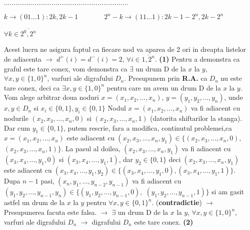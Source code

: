 \documentclass{article}
\begin{document}
\begin{center}
$.................................................................$
\end{center}
\begin{center}
$k \rightarrow (01...1): 2k,2k-1$ \ \ \ \ \ \ \ $2^n-k \rightarrow (11...1) :  2k-1 -2^n, 2k-2^n$
\end{center}
\begin{center}
$\forall k \in \overline{2^0, 2^n}$
\end{center}
Acest lucru ne asigura faptul ca fiecare nod va aparea de 2 ori in dreapta listelor de adiacenta $\rightarrow$ $d^+(i)=d^-(i)=2$, $\forall i \in \overline{1,2^n}$. \textbf{(1)}
\newline
\newline
Pentru a demonstra ca graful este tare conex, vom demonstra ca $\exists$ un drum D de la $x$ la $y$, $\forall x,y \in \{1,0\}^n$, varfuri ale digrafului $D_n$.
\newline
\newline
Presupunem prin \textbf{R.A.} ca $D_n$ nu este tare conex, deci ca $\exists x,y \in \{1,0\}^n$ pentru care nu avem un drum D de la $x$ la $y$.
\newline
Vom alege arbitrar doua noduri $x=(x_1,x_2,...,x_n)$, $y=(y_1,y_2,..., y_n)$, unde $x,y \in D_n$ si $x_i \in \{0,1\} , y_i \in \{0,1\}$
Nodul $x=(x_1,x_2,...,x_n)$ va fi adiacent cu nodurile $(x_2,x_3,...,x_n, 0)$ si $(x_2,x_3,...,x_n, 1)$ (datorita shiftarilor la stanga). Dar cum $y_1 \in \{0,1\}$, putem rescrie, fara a modifica, continutul problemei,ca $x=(x_1,x_2,...,x_n)$ este adiacent cu $(x_2,x_3,...,x_n, y_1) \in \{(x_2,x_3,...,x_n, 0),$ $(x_2,x_3,...,x_n, 1)\} $. 
\newline
La pasul al doilea, $(x_2,x_3,...,x_n, y_1)$ va fi adiacent cu $(x_3,x_4,...,y_1, 0)$ si $(x_3,x_4,...,y_1, 1)$, dar $y_2 \in \{0,1\}$
deci $(x_2,x_3,...,x_n, y_1)$ este adiacent cu $(x_3,x_4,...,y_1, y_2) \in\{(x_3,x_4,...,y_1, 0),(x_3,x_4,...,y_1, 1)\}$.
\newline
Dupa $n-1$ pasi, $(x_n,y_1,...,y_{n-2}, y_{n-1})$ va fi adiacent cu 
$(y_1,y_2,...,y_{n-1}, y_n) \in \{(y_1,y_2,...,y_{n-1}, 0),$ $(y_1,y_2,...,y_{n-1}, 1) \}$ si am gasit astfel un drum de la $x$ la $y$ pentru $\forall x,y \in \{0,1\}^n$. (\textbf{contradictie}) $\rightarrow$ Presupunerea facuta este falsa.
\newline
$\rightarrow$ $\exists$ un drum D de la $x$ la $y$, $\forall x,y \in \{1,0\}^n$, varfuri ale digrafului $D_n$ $\rightarrow$ digrafului $D_n$ este tare conex. \textbf{(2)}
\end{document}
